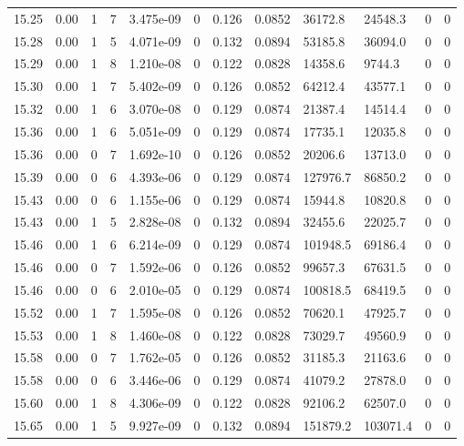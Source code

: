 \documentclass[preview]{standalone}
\begin{document}
{{{{{{{{{{{{{{{{{{{\begin{tabular}{L{1.2cm}C{1.2cm} C{0.3cm}C{0.5cm} C{1.4cm}C{1.4cm} C{1.4cm}C{1.4cm} C{1.6cm}C{1.6cm} C{1.6cm}C{1.6cm}}
  15.25  &  0.00  & 1     &  7 &  3.475e-09  & 0  &  0.126&   0.0852& 36172.8 & 24548.3   &  0 & 0  \\ 
  15.28  &  0.00  & 1     &  5 &  4.071e-09  & 0  &  0.132&   0.0894& 53185.8 & 36094.0   &  0 & 0  \\ 
  15.29  &  0.00  & 1     &  8 &  1.210e-08  & 0  &  0.122&   0.0828& 14358.6 & 9744.3   &  0 & 0  \\ 
  15.30  &  0.00  & 1     &  7 &  5.402e-09  & 0  &  0.126&   0.0852& 64212.4 & 43577.1   &  0 & 0  \\ 
  15.32  &  0.00  & 1     &  6 &  3.070e-08  & 0  &  0.129&   0.0874& 21387.4 & 14514.4   &  0 & 0  \\ 
  15.36  &  0.00  & 1     &  6 &  5.051e-09  & 0  &  0.129&   0.0874& 17735.1 & 12035.8   &  0 & 0  \\ 
  15.36  &  0.00  & 0     &  7 &  1.692e-10  & 0  &  0.126&   0.0852& 20206.6 & 13713.0   &  0 & 0  \\ 
  15.39  &  0.00  & 0     &  6 &  4.393e-06  & 0  &  0.129&   0.0874& 127976.7 & 86850.2   &  0 & 0  \\ 
  15.43  &  0.00  & 0     &  6 &  1.155e-06  & 0  &  0.129&   0.0874& 15944.8 & 10820.8   &  0 & 0  \\ 
  15.43  &  0.00  & 1     &  5 &  2.828e-08  & 0  &  0.132&   0.0894& 32455.6 & 22025.7   &  0 & 0  \\ 
  15.46  &  0.00  & 1     &  6 &  6.214e-09  & 0  &  0.129&   0.0874& 101948.5 & 69186.4   &  0 & 0  \\ 
  15.46  &  0.00  & 0     &  7 &  1.592e-06  & 0  &  0.126&   0.0852& 99657.3 & 67631.5   &  0 & 0  \\ 
  15.46  &  0.00  & 0     &  6 &  2.010e-05  & 0  &  0.129&   0.0874& 100818.5 & 68419.5   &  0 & 0  \\ 
  15.52  &  0.00  & 1     &  7 &  1.595e-08  & 0  &  0.126&   0.0852& 70620.1 & 47925.7   &  0 & 0  \\ 
  15.53  &  0.00  & 1     &  8 &  1.460e-08  & 0  &  0.122&   0.0828& 73029.7 & 49560.9   &  0 & 0  \\ 
  15.58  &  0.00  & 0     &  7 &  1.762e-05  & 0  &  0.126&   0.0852& 31185.3 & 21163.6   &  0 & 0  \\ 
  15.58  &  0.00  & 0     &  6 &  3.446e-06  & 0  &  0.129&   0.0874& 41079.2 & 27878.0   &  0 & 0  \\ 
  15.60  &  0.00  & 1     &  8 &  4.306e-09  & 0  &  0.122&   0.0828& 92106.2 & 62507.0   &  0 & 0  \\ 
  15.65  &  0.00  & 1     &  5 &  9.927e-09  & 0  &  0.132&   0.0894& 151879.2 & 103071.4   &  0 & 0  \\ 

\end{tabular}}}}}}}}}}}}}}}}}}}}
\end{document}
